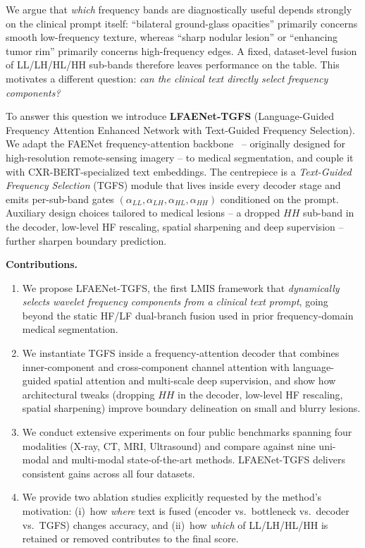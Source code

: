 \documentclass[runningheads]{llncs}
\newcommand{\method}{LFAENet-TGFS\xspace}
\newcommand{\tgfs}{TGFS\xspace}
\begin{document}
We argue that \emph{which} frequency bands are diagnostically useful
depends strongly on the clinical prompt itself:
``bilateral ground-glass opacities'' primarily concerns smooth
low-frequency texture, whereas ``sharp nodular lesion'' or
``enhancing tumor rim'' primarily concerns high-frequency edges. A
fixed, dataset-level fusion of LL/LH/HL/HH sub-bands therefore leaves
performance on the table. This motivates a different question:
\emph{can the clinical text directly select frequency components?}

To answer this question we introduce \textbf{\method}
(Language-Guided Frequency Attention Enhanced Network with
Text-Guided Frequency Selection). We adapt the FAENet
frequency-attention backbone~\cite{zhong2025faenet} -- originally
designed for high-resolution remote-sensing imagery -- to medical
segmentation, and couple it with CXR-BERT-specialized text
embeddings. The centrepiece is a \emph{Text-Guided Frequency
Selection} (\tgfs) module that lives inside every decoder stage and
emits per-sub-band gates
$(\alpha_{LL},\alpha_{LH},\alpha_{HL},\alpha_{HH})$ conditioned on the
prompt. Auxiliary design choices tailored to medical lesions -- a
dropped $HH$ sub-band in the decoder, low-level HF rescaling, spatial
sharpening and deep supervision -- further sharpen boundary
prediction.

\vspace{0.25em}\noindent\textbf{Contributions.}
\begin{enumerate}
\item We propose \method, the first LMIS framework that
    \emph{dynamically selects wavelet frequency components from a
    clinical text prompt}, going beyond the static HF/LF dual-branch
    fusion used in prior frequency-domain medical segmentation.
\item We instantiate \tgfs inside a frequency-attention decoder that
    combines inner-component and cross-component channel attention
    with language-guided spatial attention and multi-scale deep
    supervision, and show how architectural tweaks (dropping $HH$ in
    the decoder, low-level HF rescaling, spatial sharpening) improve
    boundary delineation on small and blurry lesions.
\item We conduct extensive experiments on four public benchmarks
    spanning four modalities (X-ray, CT, MRI, Ultrasound) and compare
    against nine uni-modal and multi-modal state-of-the-art methods.
    \method delivers consistent gains across all four datasets.
\item We provide two ablation studies explicitly requested by the
    method's motivation: (i)~how \emph{where} text is fused (encoder
    vs.\ bottleneck vs.\ decoder vs.\ \tgfs) changes accuracy, and
    (ii)~how \emph{which} of LL/LH/HL/HH is retained or removed
    contributes to the final score.
\end{enumerate}
\end{document}
